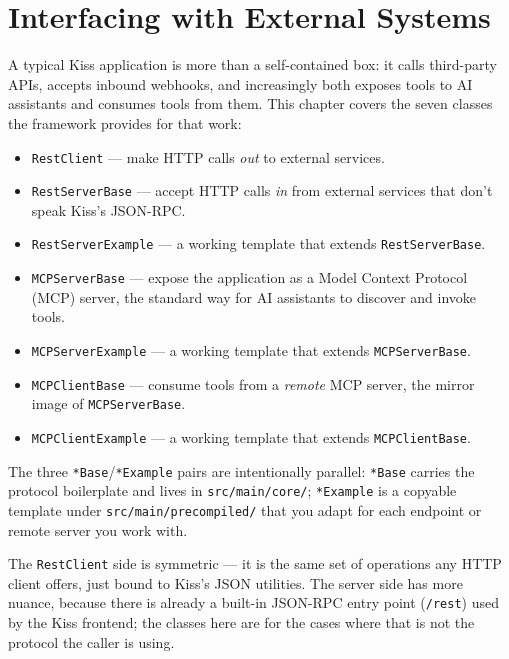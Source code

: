 \chapter{Interfacing with External Systems}
\label{ch:external}

A typical Kiss application is more than a self-contained box: it calls third-party APIs, accepts inbound webhooks, and increasingly both exposes tools to AI assistants and consumes tools from them.  This chapter covers the seven classes the framework provides for that work:

\begin{itemize}
  \item \texttt{RestClient} --- make HTTP calls \emph{out} to external services.
  \item \texttt{RestServerBase} --- accept HTTP calls \emph{in} from external services that don't speak Kiss's JSON-RPC.
  \item \texttt{RestServerExample} --- a working template that extends \texttt{RestServerBase}.
  \item \texttt{MCPServerBase} --- expose the application as a Model Context Protocol (MCP) server, the standard way for AI assistants to discover and invoke tools.
  \item \texttt{MCPServerExample} --- a working template that extends \texttt{MCPServerBase}.
  \item \texttt{MCPClientBase} --- consume tools from a \emph{remote} MCP server, the mirror image of \texttt{MCPServerBase}.
  \item \texttt{MCPClientExample} --- a working template that extends \texttt{MCPClientBase}.
\end{itemize}

\noindent
The three \texttt{*Base}/\texttt{*Example} pairs are intentionally parallel: \texttt{*Base} carries the protocol boilerplate and lives in \texttt{src/main/core/}; \texttt{*Example} is a copyable template under \texttt{src/main/precompiled/} that you adapt for each endpoint or remote server you work with.

\noindent
The \texttt{RestClient} side is symmetric --- it is the same set of operations any HTTP client offers, just bound to Kiss's JSON utilities.  The server side has more nuance, because there is already a built-in JSON-RPC entry point (\texttt{/rest}) used by the Kiss frontend; the classes here are for the cases where that is not the protocol the caller is using.


